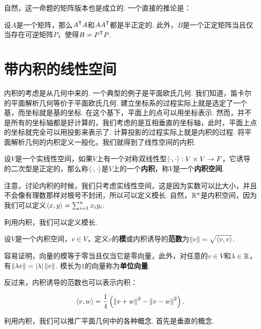 自然，这一命题的矩阵版本也是成立的. 一个直接的推论是：

\begin{corollary}\label{corollary:positive-definite}
设$A$是一个矩阵，那么$A^{\mathsf{T}} A$和$AA^{\mathsf{T}}$都是半正定的. 此外，$B$是一个正定矩阵当且仅当存在可逆矩阵$P$，使得$B=P^{\mathsf{T}} P$.
\end{corollary}

\section{带内积的线性空间}\label{sec:inner-product}

内积的考虑是从几何中来的. 一个典型的例子是平面欧氏几何. 我们知道，笛卡尔的平面解析几何等价于平面欧氏几何. 建立坐标系的过程实际上就是选定了一个基，而坐标就是基的坐标. 在这个基下，平面上的点可以用坐标表示. 然而，并不是所有的坐标轴都是好计算的，我们考虑的是互相垂直的坐标轴，此时，平面上点的坐标就完全可以用投影来表示了. 计算投影的过程实际上就是内积的过程. 将平面解析几何的内积定义一般化，我们就得到了线性空间的内积. 


\begin{definition}[内积]
设$V$是一个实线性空间，如果$V$上有一个对称双线性型$\left\langle{\cdot},{\cdot}\right\rangle:V\times V\to F$，它诱导的二次型是正定的，那么称$\left\langle{\cdot},{\cdot}\right\rangle$是$V$上的一个\textbf{内积}，称$V$是一个\textbf{内积空间}. 
\end{definition}

注意，讨论内积的时候，我们只考虑实线性空间，这是因为实数可以比大小，并且不会像有理数那样对根号不封闭，所以可以定义模长. 自然，$\mathbb{R}^n$是内积空间，因为我们可以定义$\left\langle{x},{y}\right\rangle=\sum_{i=1}^n x_iy_i$. 

利用内积，我们可以定义模长. 

\begin{definition}[模]
设$V$是一个内积空间，$v\in V$，定义$v$的\textbf{模}或内积诱导的\textbf{范数}为$\left\|v\right\|=\sqrt{\left\langle{v},{v}\right\rangle}$.
\end{definition}

容易证明，向量的模等于零当且仅当它是零向量，此外，对任意的$v\in V$和$\lambda\in\mathbb{R}$，有$\left\|\lambda v\right\|=|\lambda|\left\|v\right\|$. 模长为$1$的向量称为\textbf{单位向量}.

反过来，内积诱导的范数也可以表示内积：

\begin{equation}
    \left\langle{v},{w}\right\rangle=\frac{1}{4}\left(\left\|v+w\right\|^2-\left\|v-w\right\|^2\right).\label{eq:inner}
\end{equation}

利用内积，我们可以推广平面几何中的各种概念. 首先是垂直的概念. 

